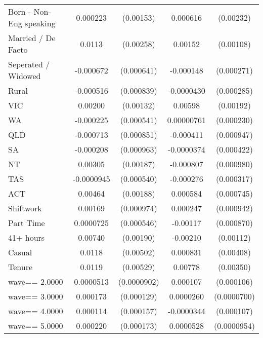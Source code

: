 {\begin{tabular}{l*{2}{cc}}
Born - Non-Eng speaking&    0.000223         &   (0.00153)&    0.000616         &   (0.00232)\\
Married / De Facto  &      0.0113\sym{***}&   (0.00258)&     0.00152         &   (0.00108)\\
Seperated / Widowed &   -0.000672         &  (0.000641)&   -0.000148         &  (0.000271)\\
Rural               &   -0.000516         &  (0.000839)&  -0.0000430         &  (0.000285)\\
VIC                 &     0.00200         &   (0.00132)&     0.00598\sym{***}&   (0.00192)\\
WA                  &   -0.000225         &  (0.000541)&  0.00000761         &  (0.000230)\\
QLD                 &   -0.000713         &  (0.000851)&   -0.000411         &  (0.000947)\\
SA                  &   -0.000208         &  (0.000963)&  -0.0000374         &  (0.000422)\\
NT                  &     0.00305         &   (0.00187)&   -0.000807         &  (0.000980)\\
TAS                 &  -0.0000945         &  (0.000540)&   -0.000276         &  (0.000317)\\
ACT                 &     0.00464\sym{**} &   (0.00188)&    0.000584         &  (0.000745)\\
Shiftwork           &     0.00169\sym{*}  &  (0.000974)&    0.000247         &  (0.000942)\\
Part Time           &   0.0000725         &  (0.000546)&    -0.00117         &  (0.000870)\\
41+ hours           &     0.00740\sym{***}&   (0.00190)&    -0.00210\sym{*}  &   (0.00112)\\
Casual              &      0.0118\sym{**} &   (0.00502)&    0.000831         &   (0.00408)\\
Tenure              &      0.0119\sym{**} &   (0.00529)&     0.00778\sym{**} &   (0.00350)\\
wave==     2.0000   &   0.0000513         & (0.0000902)&    0.000107         &  (0.000106)\\
wave==     3.0000   &    0.000173         &  (0.000129)&   0.0000260         & (0.0000700)\\
wave==     4.0000   &    0.000114         &  (0.000157)&  -0.0000344         &  (0.000107)\\
wave==     5.0000   &    0.000220         &  (0.000173)&   0.0000528         & (0.0000954)\\

\end{tabular}}
